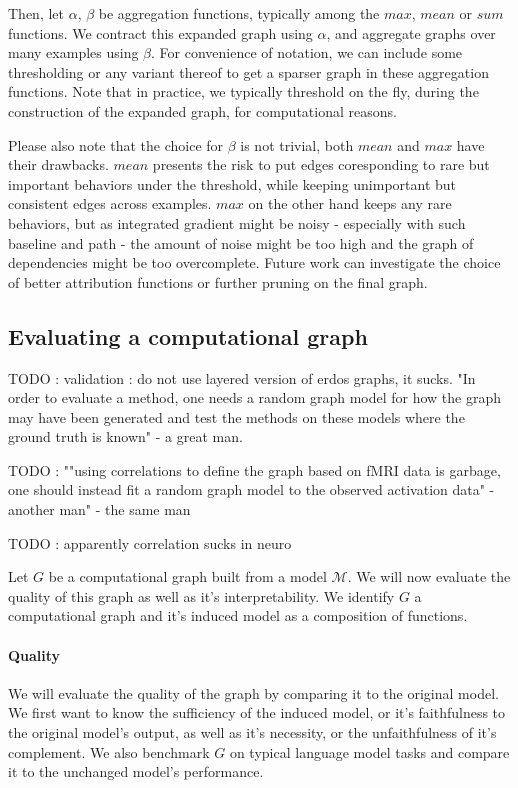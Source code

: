 \documentclass{article}
\begin{document}
Then, let $\alpha$, $\beta$ be aggregation functions, typically among the $max$, $mean$ or $sum$ functions. We contract this expanded graph using $\alpha$, and aggregate graphs over many examples using $\beta$. For convenience of notation, we can include some thresholding or any variant thereof to get a sparser graph in these aggregation functions. Note that in practice, we typically threshold on the fly, during the construction of the expanded graph, for computational reasons.

Please also note that the choice for $\beta$ is not trivial, both $mean$ and $max$ have their drawbacks. $mean$ presents the risk to put edges coresponding to rare but important behaviors under the threshold, while keeping unimportant but consistent edges across examples. $max$ on the other hand keeps any rare behaviors, but as integrated gradient might be noisy - especially with such baseline and path - the amount of noise might be too high and the graph of dependencies might be too overcomplete. Future work can investigate the choice of better attribution functions or further pruning on the final graph.%

\subsection{Evaluating a computational graph}

TODO : validation : do not use layered version of erdos graphs, it sucks. "In order to evaluate a method, one needs a random graph model for how the graph may have been generated and test the methods on these models where the ground truth is known" - a great man.

TODO : ""using correlations to define the graph based on fMRI data is garbage, one should instead fit a random graph model to the observed activation data" - another man" - the same man

TODO : apparently correlation sucks in neuro

Let $G$ be a computational graph built from a model $\mathcal{M}$. We will now evaluate the quality of this graph as well as it's interpretability. We identify $G$ a computational graph and it's induced model as a composition of functions.

\paragraph{Quality} We will evaluate the quality of the graph by comparing it to the original model. We first want to know the sufficiency of the induced model, or it's faithfulness to the original model's output, as well as it's necessity, or the unfaithfulness of it's complement. We also benchmark $G$ on typical language model tasks and compare it to the unchanged model's performance.
\end{document}
